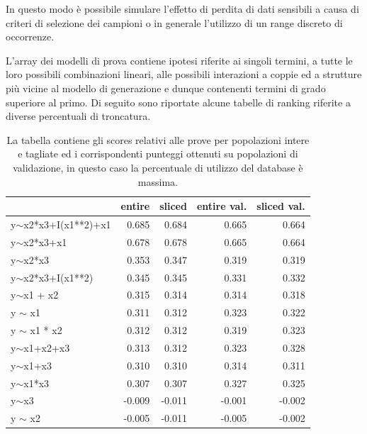 \documentclass[a4paper]{report}
\begin{document}
In questo modo è possibile simulare l'effetto di perdita di dati sensibili a causa di criteri di selezione dei campioni o in generale l'utilizzo di un range discreto di occorrenze.

L'array dei modelli di prova contiene ipotesi riferite ai singoli termini, a tutte le loro possibili combinazioni lineari, alle possibili interazioni a coppie ed a strutture più vicine al modello di generazione e dunque contenenti termini di grado superiore al primo.
Di seguito sono riportate alcune tabelle di ranking riferite a diverse percentuali di troncatura.

\begin{table}[b!thp]
\begin{tabular}{lrrrr}
\toprule
{} &  entire &  sliced &  entire val. &  sliced val. \\
\midrule
y$\sim$x2*x3+I(x1**2)+x1 &         0.685 &         0.684 &             0.665 &             0.664 \\
y$\sim$x2*x3+x1          &         0.678 &         0.678 &             0.665 &             0.664 \\
y$\sim$x2*x3             &         0.353 &         0.347 &             0.319 &             0.319 \\
y$\sim$x2*x3+I(x1**2)    &         0.345 &         0.345 &             0.331 &             0.332 \\
y$\sim$x1 + x2           &         0.315 &         0.314 &             0.314 &             0.318 \\
y $\sim$ x1              &         0.311 &         0.312 &             0.323 &             0.322 \\
y $\sim$ x1 * x2         &         0.312 &         0.312 &             0.319 &             0.323 \\
y$\sim$x1+x2+x3          &         0.313 &         0.312 &             0.323 &             0.328 \\
y$\sim$x1+x3             &         0.310 &         0.310 &             0.314 &             0.311 \\
y$\sim$x1*x3             &         0.307 &         0.307 &             0.327 &             0.325 \\
y$\sim$x3                &        -0.009 &        -0.011 &            -0.001 &            -0.002 \\
y $\sim$ x2              &        -0.005 &        -0.011 &            -0.005 &            -0.002 \\
\bottomrule
\end{tabular}
\caption{La tabella contiene gli scores relativi alle prove per popolazioni intere e tagliate ed i corrispondenti punteggi  ottenuti su popolazioni di validazione, in questo caso la percentuale di utilizzo del database è massima.}
\end{table}
\end{document}

